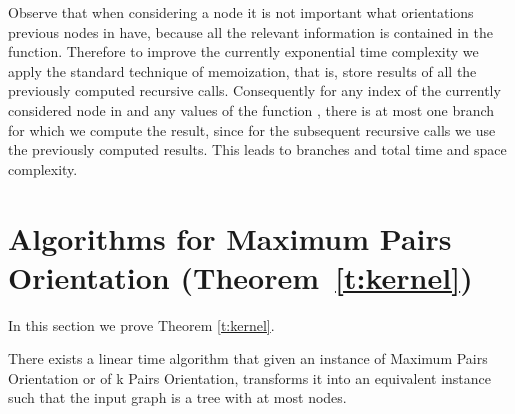 \documentclass[envcountsame]{llncs}
\begin{document}
Observe that when considering a node  it is not important what orientations previous nodes in  have,
because all the relevant information is contained in the  function. 
Therefore to improve the currently exponential time complexity we apply the standard technique of 
memoization, that is, store results of all the previously computed recursive calls.
Consequently for any index of the currently considered node in  
and any values of the function , there is at most one branch
for which we compute the result, since for the subsequent recursive calls
we use the previously computed results.
This leads to  branches and  total time and space complexity.

\section{Algorithms for {\sf Maximum Pairs Orientation} (Theorem~\ref{t:kernel})} \label{s:kernel}

In this section we prove Theorem \ref{t:kernel}.

\begin{lemma}
\label{lem:kernel}
There exists a linear time algorithm that given an instance 
of {\sf Maximum Pairs Orientation} or of {\sf k Pairs Orientation},
transforms it into an equivalent instance such that the input graph is a tree
with at most  nodes.
\end{lemma}
\end{document}
